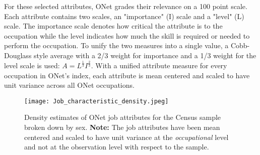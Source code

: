 \documentclass[12pt]{article}
\theoremstyle{definition}
\begin{document}
\bigskip

For these selected attributes, ONet grades their relevance on a 100 point scale. Each attribute contains two scales, an "importance" (I) scale and a "level" (L) scale. The importance scale denotes how critical the attribute is to the occupation while the level indicates how much the skill is required or needed to perform the occupation. To unify the two measures into a single value, a Cobb-Douglass style average with a 2/3 weight for importance and a 1/3 weight for the level scale is used: $A = L^{\frac{1}{3}} I^{\frac{2}{3}}$. With a unified attribute measure for every occupation in ONet's index, each attribute is mean centered and scaled to have unit variance across all ONet occupations.


\begin{figure}[t!]
  \texttt{[image: Job\_characteristic\_density.jpeg]}
  \caption{Density estimates of ONet job attributes for the Census sample broken down by sex. \textbf{Note:} The job attributes have been mean centered and scaled to have unit variance at the \textit{occupational} level and not at the observation level with respect to the sample.}
  \label{fig:JobChar_vs_sex}
\end{figure}
\end{document}
